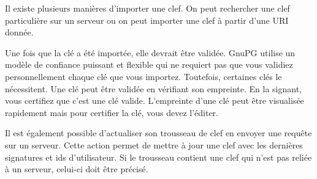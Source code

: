 Il existe plusieurs manières d'importer une clef. On peut rechercher une clef particulière sur un serveur ou on peut importer une clef à partir d'une URI donnée.

Une fois que la clé a été importée, elle devrait être validée. GnuPG utilise un modèle de confiance puissant et flexible qui ne requiert pas que vous validiez personnellement chaque clé que vous importez. Toutefois, certaines clés le nécessitent. Une clé peut être validée en vérifiant son empreinte. En la signant, vous certifiez que c'est une clé valide. L'empreinte d'une clé peut être visualisée rapidement mais pour certifier la clé, vous devez l'éditer.

Il est également possible d'actualiser son trousseau de clef en envoyer une requête sur un serveur. Cette action permet de mettre à jour une clef avec les dernières signatures et ids d'utilisateur. Si le trousseau contient une clef qui n'est pas reliée à un serveur, celui-ci doit être précisé.

